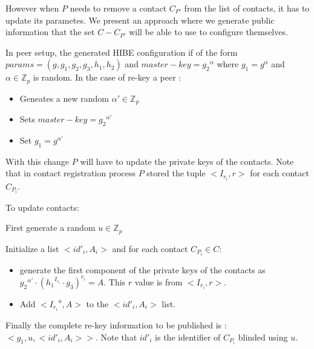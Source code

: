 However when $P$ needs to remove a contact $C_{P'}$ from the list of contacts, it has to update its parametes. We present an approach where we generate public information that the set $C - C_{P'}$ will be able to use to configure themselves.

In peer setup, the generated HIBE configuration if of the form  $params = (g, g_1, g_2, g_3, h_1, h_2)$ and $master-key = {g_2}^{\alpha}$ where $g_1 = g^{\alpha}$ and $\alpha \in \mathbb{Z}_p$ is random. In the case of re-key a peer :
\begin{itemize}
\item Geneates a new random $\alpha' \in \mathbb{Z}_p$
\item Sets $master-key = {g_2}^{\alpha'}$
\item Set $g_1 = g^{\alpha'}$
\end{itemize}

With this change $P$ will have to update the private keys of the contacts. Note that in contact registration process $P$ stored the tuple $<I_{r_i}, r>$ for each contact $C_{P_i}$. 

To update contacts:

First generate a random $u \in \mathbb{Z}_p$

Initialize a list $<{id'}_i, A_i>$ and for each contact $C_{P_i} \in C$:
\begin{itemize}
\item generate the first component of the private keys of the contacts as ${{g_2}^{\alpha'}} \cdot {({{h_1}^{I_{r_i}}} \cdot {g_3} )}^{r_i} = A$. This $r$ value is from $<I_{r_i}, r>$.
\item Add  $<{{I_{r_i}}^u}, A>$ to the $<{id'}_i, A_i>$ list.
\end{itemize}

Finally the complete re-key information to be published is : $<g_1, u, <{id'}_i, A_i>>$. Note that ${id'}_i$ is the identifier of $C_{P_i}$ blinded using $u$.
